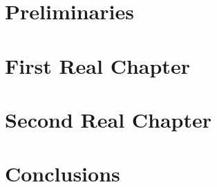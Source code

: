 \documentclass[a4paper,10pt,twoside]{report}
\theoremstyle{definition}
\begin{document}
\clearemptydoublepage

\chapter{Preliminaries}\label{chapter:preliminaries}


\clearemptydoublepage

\chapter{First Real Chapter}\label{chapter:first_real_chapter}


\clearemptydoublepage

\chapter{Second Real Chapter}\label{chapter:second_real_chapter}


\clearemptydoublepage

\chapter{Conclusions}\label{chapter:conclusions}


\clearemptydoublepage

%



\clearemptydoublepage

\appendix
{}


\end{document}
